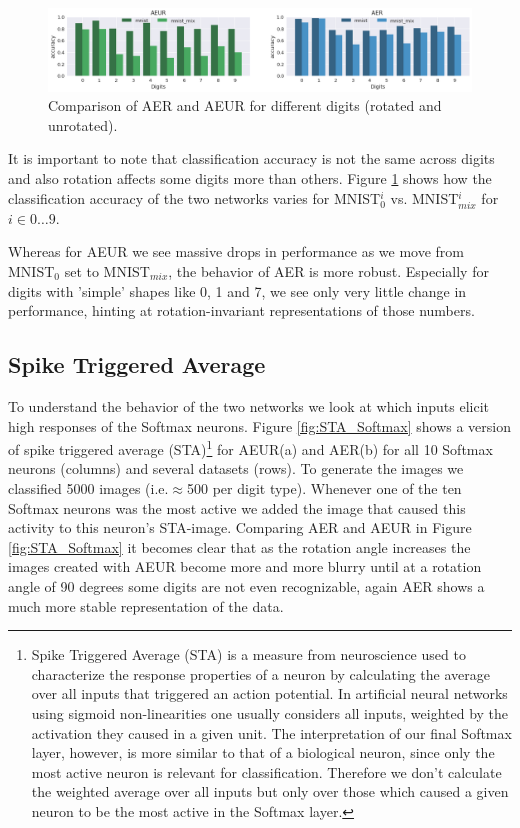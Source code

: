 \documentclass[10pt,a4paper]{article}
\begin{document}
\begin{figure}[b!]
\includegraphics[width=1\textwidth]{AER_AEUR_digits.png}
\caption{\footnotesize{\footnotesize{Comparison of AER and AEUR for different digits (rotated and unrotated).}}}
\label{fig:Digits}
\end{figure}

\noindent It is important to note that classification accuracy is not the same across digits and also rotation affects some digits more than others. Figure \ref{fig:Digits} shows how the classification accuracy of the two networks varies for MNIST$_{0}^{i}$ vs. MNIST$_{mix}^i$ for $i \in 0 \dots 9$.\newline 

\noindent Whereas for AEUR we see massive drops in performance as we move from MNIST$_0$ set to MNIST$_{mix}$, the behavior of AER is more robust. Especially for digits with 'simple' shapes like 0, 1 and 7, we see only very little change in performance, hinting at rotation-invariant representations of those numbers.

\subsection{Spike Triggered Average}
To understand the behavior of the two networks we look at which inputs elicit high responses of the Softmax neurons. Figure \ref{fig:STA_Softmax} shows a version of spike triggered average (STA)\footnote{Spike Triggered Average (STA) is a measure from neuroscience used to characterize the response properties of a neuron by calculating the average over all inputs that triggered an action potential. In artificial neural networks using sigmoid non-linearities one usually considers all inputs, weighted by the activation they caused in a given unit. The interpretation of our final Softmax layer, however, is more similar to that of a biological neuron, since only the most active neuron is relevant for classification. Therefore we don't calculate the weighted average over all inputs but only over those which caused a given neuron to be the most active in the Softmax layer.} for AEUR(a) and AER(b) for all 10 Softmax neurons (columns) and several datasets (rows). To generate the images we classified 5000 images (i.e.$\approx$500 per digit type). Whenever one of the ten Softmax neurons was the most active we added the image that caused this activity to this neuron's STA-image. Comparing AER and AEUR in Figure \ref{fig:STA_Softmax} it becomes clear that as the rotation angle increases the images created with AEUR become more and more blurry until at a rotation angle of 90 degrees some digits are not even recognizable, again AER shows a much more stable representation of the data. 
\end{document}
